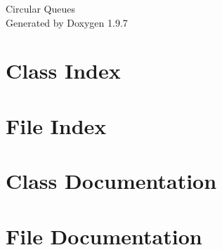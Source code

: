 \documentclass[twoside]{book}
\newcommand{\+}{\discretionary{\mbox{\scriptsize$\hookleftarrow$}}{}{}}
\newcommand{\clearemptydoublepage}{%
    \newpage{\pagestyle{empty}\cleardoublepage}%
  }
\begin{document}
  \raggedbottom
  \begin{titlepage}
  \vspace*{7cm}
  \begin{center}%
  {\Large Circular Queues}\\
  \vspace*{1cm}
  {\large Generated by Doxygen 1.9.7}\\
  \end{center}
  \end{titlepage}
  \clearemptydoublepage
  \tableofcontents
  \clearemptydoublepage

\chapter{Class Index}

\chapter{File Index}

\chapter{Class Documentation}

\chapter{File Documentation}

  \backmatter
  \newpage
  \clearemptydoublepage
  \printindex
\end{document}
